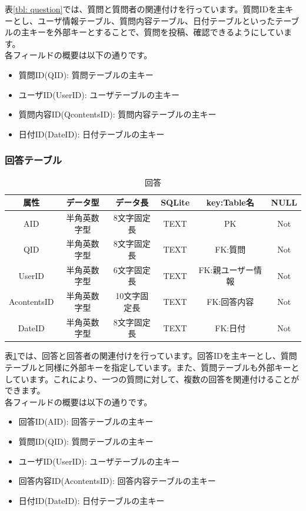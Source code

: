 \documentclass[a4j]{jarticle}
\begin{document}
表\ref{tbl: question}では、質問と質問者の関連付けを行っています。質問IDを主キーとし、ユーザ情報テーブル、質問内容テーブル、日付テーブルといったテーブルの主キーを外部キーとすることで、質問を投稿、確認できるようにしています。\\
各フィールドの概要は以下の通りです。
\begin{itemize}
  \item 質問ID(QID):
  質問テーブルの主キー
  \item ユーザID(UserID):
  ユーザテーブルの主キー
  \item 質問内容ID(QcontentsID):
  質問内容テーブルの主キー
  \item 日付ID(DateID):
  日付テーブルの主キー
\end{itemize}

\subsubsection{回答テーブル}
\begin{table}[H]
    \caption{回答}
    \label{tbl: answer}
    \begin{center}
        \begin{tabular}{|c|c|c|c|c|c|} \hline
            属性 & データ型 & データ長 & SQLite & key:Table名 & NULL\\ \hline \hline
            AID & 半角英数字型 & 8文字固定長 & TEXT & PK & Not\\ \hline
            QID & 半角英数字型 & 8文字固定長 & TEXT & FK:質問 & Not\\ \hline
            UserID & 半角英数字型 & 6文字固定長 & TEXT & FK:親ユーザー情報 & Not\\ \hline
            AcontentsID & 半角英数字型 & 10文字固定長 & TEXT & FK:回答内容 & Not\\ \hline
            DateID & 半角英数字型 & 8文字固定長 & TEXT & FK:日付 & Not\\ \hline
        \end{tabular}
    \end{center}
\end{table}
表\ref{tbl: answer}では、回答と回答者の関連付けを行っています。回答IDを主キーとし、質問テーブルと同様に外部キーを指定しています。また、質問テーブルも外部キーとしています。これにより、一つの質問に対して、複数の回答を関連付けることができます。\\
各フィールドの概要は以下の通りです。
\begin{itemize}
  \item 回答ID(AID):
  回答テーブルの主キー
  \item 質問ID(QID):
  質問テーブルの主キー
  \item ユーザID(UserID):
  ユーザテーブルの主キー
  \item 回答内容ID(AcontentsID):
  回答内容テーブルの主キー
  \item 日付ID(DateID):
  日付テーブルの主キー
\end{itemize}
\end{document}
